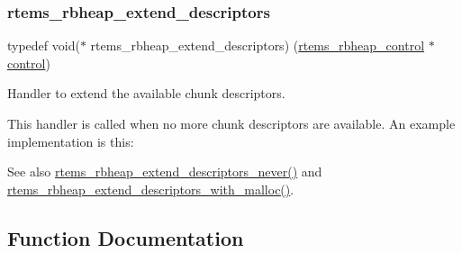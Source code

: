 \subsubsection{\texorpdfstring{rtems\_rbheap\_extend\_descriptors}{rtems\_rbheap\_extend\_descriptors}}
{\footnotesize\ttfamily typedef void($\ast$ rtems\+\_\+rbheap\+\_\+extend\+\_\+descriptors) (\mbox{\hyperlink{structrtems__rbheap__control}{rtems\+\_\+rbheap\+\_\+control}} $\ast$\mbox{\hyperlink{structcontrol}{control}})}



Handler to extend the available chunk descriptors. 

This handler is called when no more chunk descriptors are available. An example implementation is this\+:


\begin{DoxyCode}{0}
\DoxyCodeLine{\{}
\DoxyCodeLine{}
\DoxyCodeLine{  \}}
\DoxyCodeLine{\}}
\end{DoxyCode}


\begin{DoxySeeAlso}{See also}
\mbox{\hyperlink{group__RBHeap_ga9896930146188b96df52a73099cf8d10}{rtems\+\_\+rbheap\+\_\+extend\+\_\+descriptors\+\_\+never()}} and \mbox{\hyperlink{group__RBHeap_gaa1ea1346258fa0d79fc4ac9da02f761d}{rtems\+\_\+rbheap\+\_\+extend\+\_\+descriptors\+\_\+with\+\_\+malloc()}}. 
\end{DoxySeeAlso}


\subsection{Function Documentation}
\mbox{\label{group__RBHeap_ga2eb3695546542f459cc424d1a36ea6f6}} 
